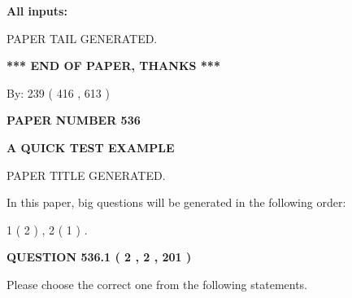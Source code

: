 \documentclass[12pt]{article}
\begin{document}
   
\noindent{}
   
   
   
   
\noindent\vspace{0.1in}\hspace{-0.08in} {\textbf{\Large{All inputs: }}}
   
   
   
   
   
   
 \vspace{0.2in}
 
   
   
\vspace{2.0in} PAPER TAIL GENERATED.
   
   
   
   
\vspace{1.0in} 
{\textbf{\large{ *** END OF PAPER, THANKS *** }}} 
   
   
\hspace{1.0in} By: 
 239 ( 416 ,  613 )
   
   
   
   
\newpage 
\setcounter{page}{ 
   536001 } 
   
   
   
   
 {\textbf{ \Large{ PAPER NUMBER  536  }}}
   
   
\vspace{0.2in}
   
   
   
   
   
   
   
   
 \vspace{0.2in}
{\LARGE {\textbf{ A QUICK TEST EXAMPLE}}}
   
   
 PAPER TITLE GENERATED.
   
   
   
\vspace{0.2in}
   
In this paper, big questions will be generated in the following order: 
   
   
   1 ( 2 )
 ,
   2 ( 1 )
 .
  
\vspace{0.2in}
  
{\textbf{\Large{QUESTION
536.1 
 ( 2 , 2 , 201 )
}}}
  
  
Please choose the correct one from the following statements.
 
\end{document}

